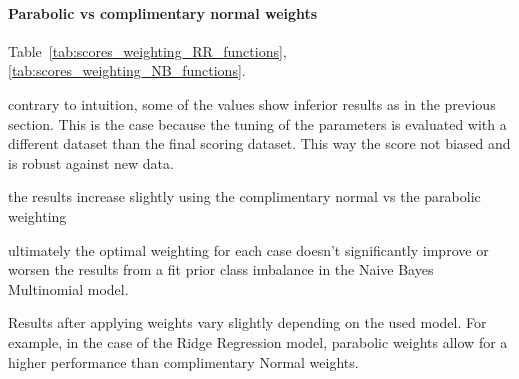 \documentclass[12pt,a4paper]{report}
\begin{document}
\paragraph{Parabolic vs complimentary normal weights} Table~\ref{tab:scores_weighting_RR_functions}, \ref{tab:scores_weighting_NB_functions}.

\begin{list}{•}{}
\item contrary to intuition, some of the values show inferior results as in the previous section. This is the case because the tuning of the parameters is evaluated with a different dataset than the final scoring dataset. This way the score not biased and is robust against new data.
\item the results increase slightly using the complimentary normal vs the parabolic weighting
\item ultimately the optimal weighting for each case doesn't significantly improve or worsen the results from a fit prior class imbalance in the Naive Bayes Multinomial model.
\item Results after applying weights vary slightly depending on the used model. For example, in the case of the Ridge Regression model, parabolic weights allow for a higher performance than complimentary Normal weights.
\end{list} 
\end{document}
